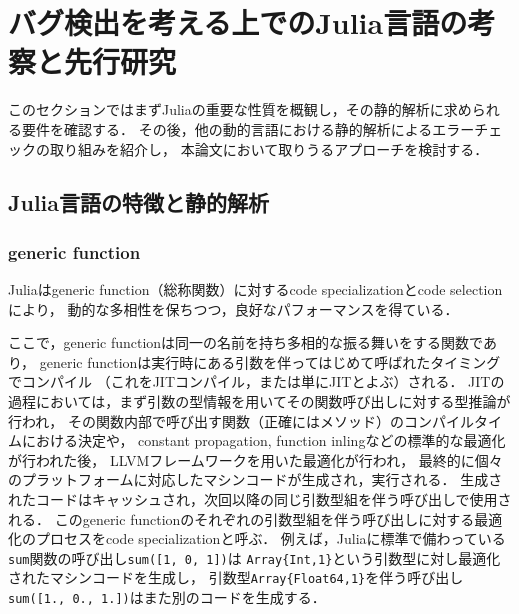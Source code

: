 
\section{バグ検出を考える上でのJulia言語の考察と先行研究}

このセクションではまずJuliaの重要な性質を概観し，その静的解析に求められる要件を確認する．
その後，他の動的言語における静的解析によるエラーチェックの取り組みを紹介し，
本論文において取りうるアプローチを検討する．

\subsection{Julia言語の特徴と静的解析}


\subsubsection{generic function}

Juliaはgeneric function（総称関数）に対するcode specializationとcode selectionにより，
動的な多相性を保ちつつ，良好なパフォーマンスを得ている．

ここで，generic functionは同一の名前を持ち多相的な振る舞いをする関数であり，
generic functionは実行時にある引数を伴ってはじめて呼ばれたタイミングでコンパイル
（これをJITコンパイル，または単にJITとよぶ）される．
JITの過程においては，まず引数の型情報を用いてその関数呼び出しに対する型推論が行われ，
その関数内部で呼び出す関数（正確にはメソッド）のコンパイルタイムにおける決定や，
constant propagation, function inlingなどの標準的な最適化が行われた後，
LLVMフレームワーク\cite{LLVM}を用いた最適化が行われ，
最終的に個々のプラットフォームに対応したマシンコードが生成され，実行される．
生成されたコードはキャッシュされ，次回以降の同じ引数型組を伴う呼び出しで使用される．
このgeneric functionのそれぞれの引数型組を伴う呼び出しに対する最適化のプロセスをcode specializationと呼ぶ．
例えば，Juliaに標準で備わっている\verb|sum|関数の呼び出し\verb|sum([1, 0, 1])|は
\verb|Array{Int,1}|という引数型に対し最適化されたマシンコードを生成し，
引数型\verb|Array{Float64,1}|を伴う呼び出し\verb|sum([1., 0., 1.])|はまた別のコードを生成する．

